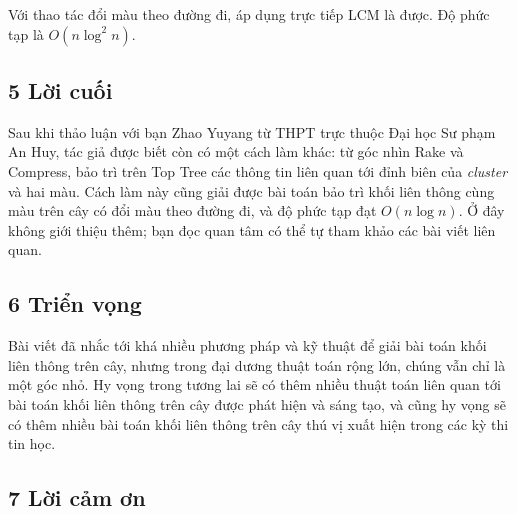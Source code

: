 \documentclass[11pt]{article}
\begin{document}
Với thao tác đổi màu theo đường đi, áp dụng trực tiếp LCM là được. Độ phức tạp
là \(O(n\log^2 n)\).

\subsection*{5 Lời cuối}

Sau khi thảo luận với bạn Zhao Yuyang từ THPT trực thuộc Đại học Sư phạm An
Huy, tác giả được biết còn có một cách làm khác: từ góc nhìn Rake và Compress,
bảo trì trên Top Tree các thông tin liên quan tới đỉnh biên của \emph{cluster}
và hai màu. Cách làm này cũng giải được bài toán bảo trì khối liên thông cùng
màu trên cây có đổi màu theo đường đi, và độ phức tạp đạt \(O(n\log n)\). Ở đây
không giới thiệu thêm; bạn đọc quan tâm có thể tự tham khảo các bài viết liên
quan.

\subsection*{6 Triển vọng}

Bài viết đã nhắc tới khá nhiều phương pháp và kỹ thuật để giải bài toán khối
liên thông trên cây, nhưng trong đại dương thuật toán rộng lớn, chúng vẫn chỉ là
một góc nhỏ. Hy vọng trong tương lai sẽ có thêm nhiều thuật toán liên quan tới
bài toán khối liên thông trên cây được phát hiện và sáng tạo, và cũng hy vọng
sẽ có thêm nhiều bài toán khối liên thông trên cây thú vị xuất hiện trong các
kỳ thi tin học.

\subsection*{7 Lời cảm ơn}
\end{document}
